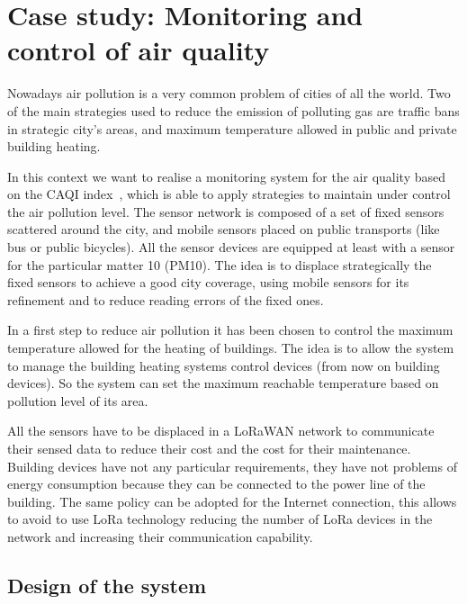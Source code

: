 \section{Case study: Monitoring and control of air quality}

\label{sec:case-staudyAC}

Nowadays air pollution is a very common problem of cities of all the world.
Two of the main strategies used to reduce the emission of polluting gas are traffic bans in strategic city's areas, and maximum temperature allowed in public and private building heating.

In this context we want to realise a monitoring system for the air quality based on the CAQI index~\cite{CAQI}, which is able to apply strategies to maintain under control the air pollution level.
The sensor network is composed of a set of fixed sensors scattered around the city, and mobile sensors placed on public transports (like bus or public bicycles).
All the sensor devices are equipped at least with a sensor for the particular matter 10 (PM10).
The idea is to displace strategically the fixed sensors to achieve a good city coverage, using mobile sensors for its refinement and to reduce reading errors of the fixed ones.

In a first step to reduce air pollution it has been chosen to control the maximum temperature allowed for the heating of buildings.
The idea is to allow the system to manage the building heating systems control devices (from now on building devices). So the system can set the maximum reachable temperature based on pollution level of its area.

All the sensors have to be displaced in a LoRaWAN network to communicate their sensed data to reduce their cost and the cost for their maintenance. 
Building devices have not any particular requirements, they have not problems of energy consumption because they can be connected to the power line of the building.
The same policy can be adopted for the Internet connection, this allows to avoid to use LoRa technology reducing the number of LoRa devices in the network and increasing their communication capability.

\subsection{Design of the system}

